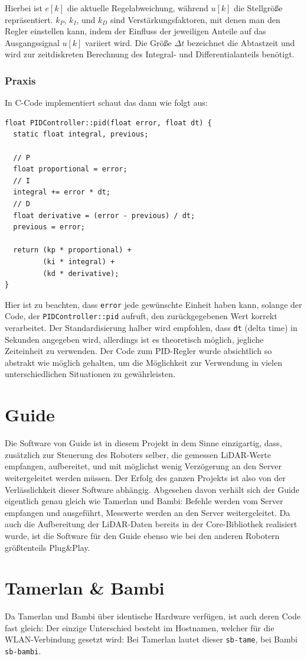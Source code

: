 Hierbei ist $e[k]$ die aktuelle Regelabweichung,
während $u[k]$ die Stellgröße repräsentiert.
%
$k_P$, $k_I$, und $k_D$ sind Verstärkungsfaktoren,
mit denen man den Regler einstellen kann,
indem der Einfluss der jeweiligen Anteile
auf das Ausgangssignal $u[k]$ variiert wird.
%
Die Größe $\Delta t$ bezeichnet die Abtastzeit und wird zur zeitdiskreten
Berechnung des Integral- und Differentialanteils benötigt.

\subsubsection{Praxis}
In C-Code implementiert schaut das dann wie folgt aus:
\begin{lstlisting}[caption={Implementierung des PID-Reglers in C}]
float PIDController::pid(float error, float dt) {
  static float integral, previous;

  // P
  float proportional = error;
  // I
  integral += error * dt;
  // D
  float derivative = (error - previous) / dt;
  previous = error;

  return (kp * proportional) +
         (ki * integral) +
         (kd * derivative);
}
\end{lstlisting}
Hier ist zu beachten,
dass \texttt{error}
jede gewünschte Einheit haben kann,
solange der Code,
der \texttt{PIDController::pid} aufruft,
den zurückgegebenen Wert korrekt verarbeitet.
%
Der Standardisierung halber wird empfohlen,
dass \texttt{dt} (delta time) in Sekunden angegeben wird,
allerdings ist es theoretisch möglich,
jegliche Zeiteinheit zu verwenden. 
%
Der Code zum PID-Regler wurde absichtlich so abstrakt wie möglich gehalten,
um die Möglichkeit zur Verwendung in vielen unterschiedlichen Situationen zu gewährleisten.

\section{Guide}
\label{subsec:software_guide}
Die Software von Guide ist in diesem Projekt in dem Sinne einzigartig,
dass,
zusätzlich zur Steuerung des Roboters selber,
die gemessen LiDAR-Werte empfangen,
aufbereitet,
und mit möglichst wenig Verzögerung an den Server weitergeleitet werden müssen.
%
Der Erfolg des ganzen Projekts ist also von der Verlässlichkeit dieser Software abhängig.
%
Abgesehen davon verhält sich der Guide eigentlich genau gleich wie Tamerlan und Bambi:
%
Befehle werden vom Server empfangen und ausgeführt,
Messwerte werden an den Server weitergeleitet.
%
Da auch die Aufbereitung der LiDAR-Daten bereits in der Core-Bibliothek realisiert wurde,
ist die Software für den Guide ebenso wie bei den anderen Robotern größtenteils Plug\&Play.

\section{Tamerlan \& Bambi}
\label{subsec:software_tamerlan}
Da Tamerlan und Bambi über identische Hardware verfügen,
ist auch deren Code fast gleich:
%
Der einzige Unterschied besteht im Hostnamen, welcher für die WLAN-Verbindung gesetzt wird:
%
Bei Tamerlan lautet dieser \texttt{sb-tame}, bei Bambi \texttt{sb-bambi}.